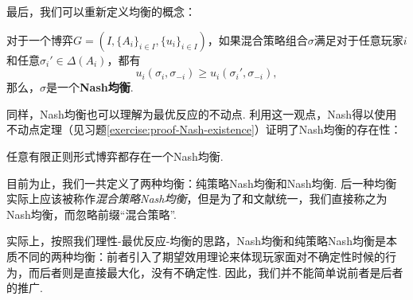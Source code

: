 最后，我们可以重新定义均衡的概念：

\begin{definition}[Nash均衡]
对于一个博弈$G=(I,\{A_i\}_{i\in I},\{u_i\}_{i\in I})$，如果混合策略组合$\sigma$满足对于任意玩家$i$和任意$\sigma_i'\in \Delta(A_i)$，都有
\[u_i(\sigma_i,\sigma_{-i})\geq u_i(\sigma_i',\sigma_{-i}),\]
那么，$\sigma$是一个\textbf{Nash均衡}.
\end{definition}

同样，Nash均衡也可以理解为最优反应的不动点. 利用这一观点，Nash得以使用不动点定理（见习题\ref{exercise:proof-Nash-existence}）证明了Nash均衡的存在性：
\begin{theorem}[Nash均衡存在性定理]\label{thm:Nash-existence}
任意有限正则形式博弈都存在一个Nash均衡.
\end{theorem}

\begin{remark}
    目前为止，我们一共定义了两种均衡：纯策略Nash均衡和Nash均衡. 后一种均衡实际上应该被称作\textit{混合策略Nash均衡}，但是为了和文献统一，我们直接称之为Nash均衡，而忽略前缀“混合策略”.

    实际上，按照我们理性-最优反应-均衡的思路，Nash均衡和纯策略Nash均衡是本质不同的两种均衡：前者引入了期望效用理论来体现玩家面对不确定性时候的行为，而后者则是直接最大化，没有不确定性. 因此，我们并不能简单说前者是后者的推广. 
\end{remark}


